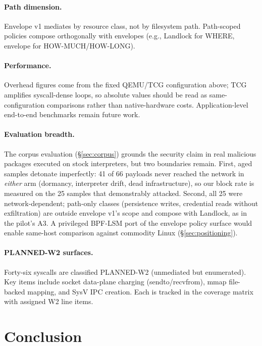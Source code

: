 \documentclass[letterpaper,twocolumn,10pt]{article}
\begin{document}
\paragraph{Path dimension.}
Envelope v1 mediates by resource class, not by filesystem path.
Path-scoped policies compose orthogonally with envelopes (e.g.,
Landlock for WHERE, envelope for HOW-MUCH/HOW-LONG).

\paragraph{Performance.}
Overhead figures come from the fixed QEMU/TCG configuration above;
TCG amplifies syscall-dense loops, so absolute values should be read
as same-configuration comparisons rather than native-hardware costs.
Application-level end-to-end benchmarks remain future work.

\paragraph{Evaluation breadth.}
The corpus evaluation (\S\ref{sec:corpus}) grounds the security claim
in real malicious packages executed on stock interpreters, but two
boundaries remain.  First, aged samples detonate imperfectly: 41 of 66
payloads never reached the network in \emph{either} arm (dormancy,
interpreter drift, dead infrastructure), so our block rate is measured
on the 25 samples that demonstrably attacked.  Second, all 25 were
network-dependent; path-only classes (persistence writes, credential
reads without exfiltration) are outside envelope v1's scope and compose
with Landlock, as in the pilot's A3.  A privileged BPF-LSM port of the
envelope policy surface would enable same-host comparison against
commodity Linux (\S\ref{sec:positioning}).

\paragraph{PLANNED-W2 surfaces.}
Forty-six syscalls are classified PLANNED-W2 (unmediated but
enumerated).  Key items include socket data-plane charging
(sendto/recvfrom), mmap file-backed mapping, and SysV IPC creation.
Each is tracked in the coverage matrix with assigned W2 line items.

\section{Conclusion}
\label{sec:conclusion}
\end{document}
